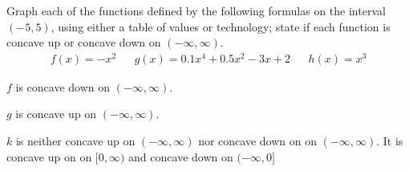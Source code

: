 \begin{doyouunderstand}
	\begin{problem}
Graph each of the functions defined 
by the following formulas on the interval $(-5,5)$, using either a table of values or technology; 
	state if each function is concave up or concave down on $(-\infty,\infty)$.
	\begin{align*}
		f(x)=-x^2 &   & g(x)=0.1x^4+0.5x^2-3x+2 &   & h(x)=x^3 
	\end{align*}
	\begin{shortsolution}
		$f$ is concave down on $(-\infty,\infty)$.
		
		
		$g$ is concave up on $(-\infty,\infty)$.
		
		
		$k$ is neither concave up on $(-\infty,\infty)$ nor concave down on on $(-\infty,\infty)$. It is concave up on on $[0,\infty)$ and concave down on $(-\infty,0]$
		
	\end{shortsolution}
	\end{problem}
\end{doyouunderstand}


